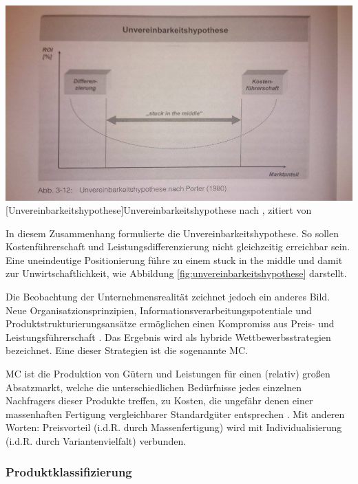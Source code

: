 \documentclass[12pt,a4paper,bibliography=totocnumbered,listof=totoc]{scrartcl}
\begin{document}
\vspace{1em}
\begin{minipage}{\linewidth}
	\centering
	\includegraphics[width=0.7\linewidth]{Abbildungen/unvereinbarkeitshypothese.jpg}
	[Unvereinbarkeitshypothese]{Unvereinbarkeitshypothese nach \cite{porter80}, zitiert von \cite{schuh05}}
	\label{fig:unvereinbarkeitshypothese}
\end{minipage}
\vspace{1em}

In diesem Zusammenhang formulierte \citeauthor{porter80} die Unvereinbarkeitshypothese. So sollen Kostenführerschaft und Leistungsdifferenzierung nicht gleichzeitig erreichbar sein. Eine uneindeutige Positionierung führe zu einem \glqq stuck in the middle\grqq{} und damit zur Unwirtschaftlichkeit, wie Abbildung \ref{fig:unvereinbarkeitshypothese} darstellt.

Die Beobachtung der Unternehmensrealität zeichnet jedoch ein anderes Bild. Neue Organisatzionsprinzipien, Informationsverarbeitungspotentiale und Produktstrukturierungsansätze ermöglichen einen Kompromiss aus Preis- und Leistungsführerschaft \citep{schuh05}. Das Ergebnis wird als hybride Wettbewerbsstrategien bezeichnet. Eine dieser Strategien ist die sogenannte \ac{MC}.

\ac{MC} ist die \glqq Produktion von Gütern und Leistungen für einen (relativ) großen Absatzmarkt, welche die unterschiedlichen Bedürfnisse jedes einzelnen Nachfragers dieser Produkte treffen, zu Kosten, die ungefähr denen einer massenhaften Fertigung vergleichbarer Standardgüter entsprechen\grqq{} \citep{piller98}. Mit anderen Worten: Preisvorteil (i.d.R. durch Massenfertigung) wird mit Individualisierung (i.d.R. durch Variantenvielfalt) verbunden.

\subsubsection{Produktklassifizierung}
 \label{subssubsection:Produktklassifizierung}
\end{document}
